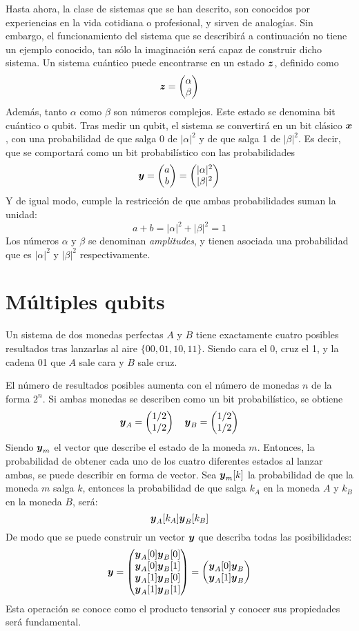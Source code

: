 Hasta ahora, la clase de sistemas que se han descrito, son conocidos por 
experiencias en la vida cotidiana o profesional, y sirven de analogías. Sin 
embargo, el funcionamiento del sistema que se describirá a continuación no tiene 
un ejemplo conocido, tan sólo la imaginación será capaz de construir dicho 
sistema.
%
Un sistema cuántico puede encontrarse en un estado $\boldsymbol{z}$, definido como
%
$$ \boldsymbol{z} = \begin{pmatrix} \alpha \\ \beta \end{pmatrix}$$
%
Además, tanto $\alpha$ como $\beta$ son números complejos. Este estado se 
denomina bit cuántico o qubit.
%
Tras medir un qubit, el sistema se convertirá en un bit clásico $\boldsymbol{x}$, con una 
probabilidad de que salga 0 de $|\alpha|^2$ y de que salga 1 de $|\beta|^2$.
Es decir, que se comportará como un bit probabilístico con las probabilidades
%
$$ \boldsymbol{y} = \begin{pmatrix} a \\ b \end{pmatrix} = \begin{pmatrix} |\alpha|^2 \\ |\beta|^2 \end{pmatrix}$$
%
Y de igual modo, cumple la restricción de que ambas probabilidades suman la 
unidad:
%
$$ a + b = |\alpha|^2 + |\beta|^2 = 1 $$
%
Los números $\alpha$ y $\beta$ se denominan \textit{amplitudes}, y tienen 
asociada una probabilidad que es $|\alpha|^2$ y $|\beta|^2$ respectivamente.

\section{Múltiples qubits}
Un sistema de dos monedas perfectas $A$ y $B$ tiene exactamente cuatro posibles 
resultados tras lanzarlas al aire $\{00, 01, 10, 11\}$. Siendo cara el 0, cruz 
el 1, y la cadena 01 que $A$ sale cara y $B$ sale cruz.

El número de resultados posibles aumenta con el número de monedas $n$ de la 
forma $2^n$. Si ambas monedas se describen como un bit probabilístico, se 
obtiene
$$ \boldsymbol{y}_A = \begin{pmatrix} 1/2 \\ 1/2 \end{pmatrix} \quad \boldsymbol{y}_B = \begin{pmatrix} 1/2 \\ 1/2 \end{pmatrix} $$
Siendo $\boldsymbol{y}_m$ el vector que describe el estado de la moneda $m$.  Entonces, la 
probabilidad de obtener cada uno de los cuatro diferentes estados al lanzar 
ambas, se puede describir en forma de vector.
Sea $\boldsymbol{y}_m[k]$ la probabilidad de que la moneda $m$ salga $k$, entonces la 
probabilidad de que salga $k_A$ en la moneda $A$ y $k_B$ en la moneda $B$, será:
$$ \boldsymbol{y}_A[k_A]  \boldsymbol{y}_B[k_B] $$
De modo que se puede construir un vector $\boldsymbol{y}$ que describa todas las 
posibilidades:
$$ \boldsymbol{y} = \begin{pmatrix} 
	\boldsymbol{y}_A[0]  \boldsymbol{y}_B[0] \\ \boldsymbol{y}_A[0]  \boldsymbol{y}_B[1] \\
	\boldsymbol{y}_A[1]  \boldsymbol{y}_B[0] \\ \boldsymbol{y}_A[1]  \boldsymbol{y}_B[1]
 \end{pmatrix}
= \begin{pmatrix} 
	\boldsymbol{y}_A[0]  \boldsymbol{y}_B \\
	\boldsymbol{y}_A[1]  \boldsymbol{y}_B
 \end{pmatrix} $$
Esta operación se conoce como el producto tensorial y conocer sus propiedades
será fundamental.

